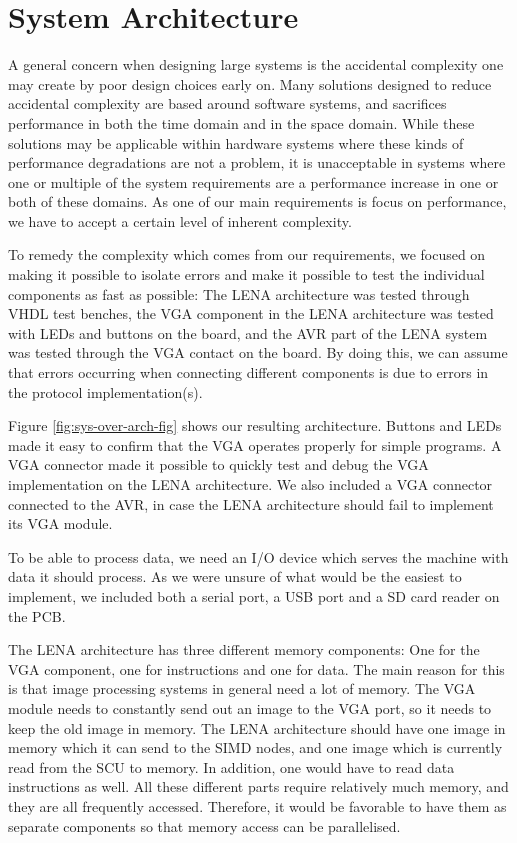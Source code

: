 \section{System Architecture}

A general concern when designing large systems is the accidental
complexity\cite[p.~8-9]{holt2004uml} one may create by poor design choices early
on. Many solutions designed to reduce accidental complexity are based around
software systems, and sacrifices performance in both the time domain and in the
space domain\cite{moseley2006out}. While these solutions may be applicable
within hardware systems where these kinds of performance degradations are not a
problem, it is unacceptable in systems where one or multiple of the system
requirements are a performance increase in one or both of these domains. As one
of our main requirements is focus on performance, we have to accept a certain
level of inherent complexity.



To remedy the complexity which comes from our requirements, we focused on making
it possible to isolate errors and make it possible to test the individual
components as fast as possible: The \ac{LENA} architecture was tested through
\ac{VHDL} test benches, the \ac{VGA} component in the \ac{LENA} architecture was
tested with \acp{LED} and buttons on the board, and the AVR part of the
\ac{LENA} system was tested through the \ac{VGA} contact on the board. By doing
this, we can assume that errors occurring when connecting different components is
due to errors in the protocol implementation(s).

Figure \ref{fig:sys-over-arch-fig} shows our resulting architecture. Buttons and
\acp{LED} made it easy to confirm that the \ac{VGA} operates properly for simple
programs. A \ac{VGA} connector made it possible to quickly test and debug the
\ac{VGA} implementation on the \ac{LENA} architecture. We also included a
\ac{VGA} connector connected to the AVR, in case the \ac{LENA} architecture
should fail to implement its \ac{VGA} module.

To be able to process data, we need an \ac{I/O} device which serves the machine
with data it should process. As we were unsure of what would be the easiest to
implement, we included both a serial port, a \ac{USB} port and a \ac{SD} card
reader on the \ac{PCB}.

The \ac{LENA} architecture has three different memory components: One for the
\ac{VGA} component, one for instructions and one for data. The main reason for
this is that image processing systems in general need a lot of memory. The
\ac{VGA} module needs to constantly send out an image to the \ac{VGA} port, so
it needs to keep the old image in memory. The \ac{LENA} architecture should have
one image in memory which it can send to the \ac{SIMD} nodes, and one image
which is currently read from the \ac{SCU} to memory. In addition, one would have
to read data instructions as well. All these different parts require relatively
much memory, and they are all frequently accessed. Therefore, it would be
favorable to have them as separate components so that memory access can be
parallelised.
